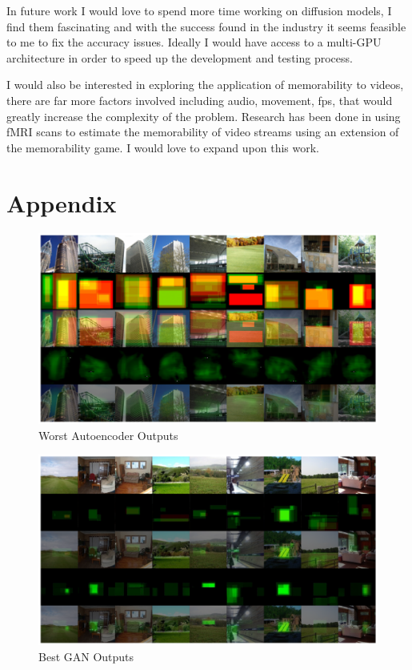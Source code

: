 \documentclass{UoYCSproject}
\begin{document}
In future work I would love to spend more time working on diffusion models, I find them fascinating and with the success found in the industry \cite{ramesh2022hierarchical, saharia2022photorealistic} it seems feasible to me to fix the accuracy issues. Ideally I would have access to a multi-GPU architecture in order to speed up the development and testing process.

I would also be interested in exploring the application of memorability to videos, there are far more factors involved including audio, movement, fps, that would greatly increase the complexity of the problem. Research has been done in \cite{HASSON2004, HASSONNeurocinematics, HASSON2008, fMRIPredictions} using fMRI scans to estimate the memorability of video streams using an extension of the memorability game. I would love to expand upon this work.

\chapter{Appendix}

\begin{figure}[ht]
    \centering
    \includegraphics[width=\linewidth]{Worst autoencoder Outputs}
    \caption{Worst Autoencoder Outputs}
    \label{fig:autoencoderWorstOutput}
\end{figure}

\begin{figure}[ht]
    \centering
    \includegraphics[width=\linewidth]{Best GAN Outputs}
    \caption{Best GAN Outputs}
    \label{fig:GANBestOutput}
\end{figure}
\end{document}
